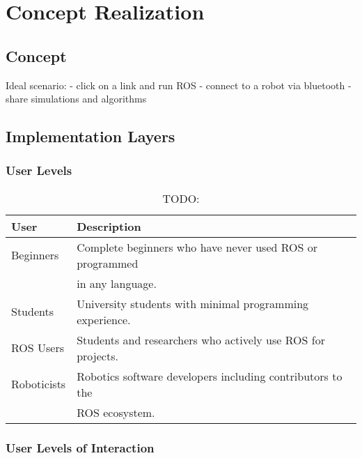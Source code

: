 \chapter{Concept Realization}\label{cha:concept}


\section{Concept}\label{sec:concept}

Ideal scenario: 
- click on a link and run ROS
- connect to a robot via bluetooth
- share simulations and algorithms

\section{Implementation Layers}

    \subsection{User Levels}

        \begin{table}[htbp]
            \centering	
            \caption{TODO:}
                \begin{tabular}{ll}
                    \toprule
                    \textbf{User} & \textbf{Description} \\
                    \midrule
                    Beginners   & Complete beginners who have never used ROS or programmed \\
                                & in any language. \\[0.5em]
                    Students    & University students with minimal programming experience. \\[0.5em]
                    ROS Users   & Students and researchers who actively use ROS for projects. \\[0.5em]
                    Roboticists & Robotics software developers including contributors to the \\
                                & ROS ecosystem. \\
                \bottomrule
            \end{tabular}\label{tab:userlevels}
        \end{table}

    \subsection{User Levels of Interaction}

